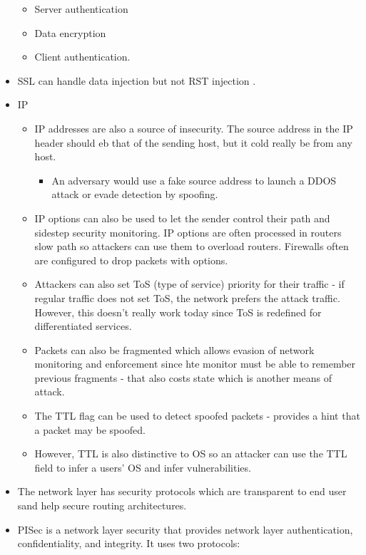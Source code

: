 \begin{itemize}
  \begin{itemize}
  \tightlist
  \item
    Server authentication
  \item
    Data encryption
  \item
    Client authentication.
  \end{itemize}
\item
  SSL can handle data injection but not RST injection .
\item
  IP

  \begin{itemize}
  \tightlist
  \item
    IP addresses are also a source of insecurity. The source address in
    the IP header should eb that of the sending host, but it cold really
    be from any host.

    \begin{itemize}
    \tightlist
    \item
      An adversary would use a fake source address to launch a DDOS
      attack or evade detection by spoofing.
    \end{itemize}
  \item
    IP options can also be used to let the sender control their path and
    sidestep security monitoring. IP options are often processed in
    routers slow path so attackers can use them to overload routers.
    Firewalls often are configured to drop packets with options.
  \item
    Attackers can also set ToS (type of service) priority for their
    traffic - if regular traffic does not set ToS, the network prefers
    the attack traffic. However, this doesn't really work today since
    ToS is redefined for differentiated services.
  \item
    Packets can also be fragmented which allows evasion of network
    monitoring and enforcement since hte monitor must be able to
    remember previous fragments - that also costs state which is another
    means of attack.
  \item
    The TTL flag can be used to detect spoofed packets - provides a hint
    that a packet may be spoofed.
  \item
    However, TTL is also distinctive to OS so an attacker can use the
    TTL field to infer a users' OS and infer vulnerabilities.
  \end{itemize}
\item
  The network layer has security protocols which are transparent to end
  user sand help secure routing architectures.
\item
  PISec is a network layer security that provides network layer
  authentication, confidentiality, and integrity. It uses two protocols:


\end{itemize}
